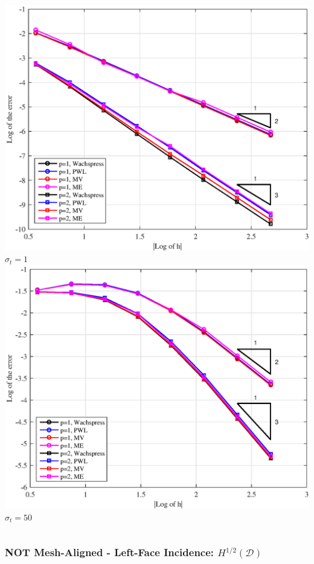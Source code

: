 \documentclass[compress,10pt]{beamer}
\begin{document}
\begin{frame}[t]
{\begin{columns}[c]
{}\includegraphics[width=\textwidth]{images/PAErr_Left_SplitPoly_sig1.eps} \\
$\sigma_t = 1$
\centering
{}\includegraphics[width=\textwidth]{images/PAErr_Left_SplitPoly_sig50.eps} \\
$\sigma_t = 50$
\end{columns}
}
{
\frametitle{NOT Mesh-Aligned - Left-Face Incidence: $H^{1/2} (\mathcal{D})$}
\vspace{1.00cm}
\begin{columns}[c]
\centering

\end{columns}}
\end{frame}
\end{document}
